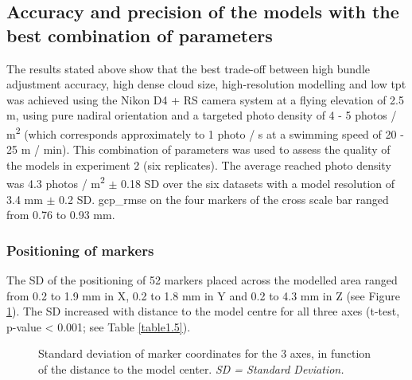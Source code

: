 \subsection{Accuracy and precision of the models with the best combination of parameters}\label{chapitre1_3.2}
The results stated above show that the best trade-off between high bundle adjustment accuracy, high dense cloud size, high-resolution modelling and low \acrshort{tpt} was achieved using the Nikon D4 + RS camera system at a flying elevation of 2.5 m, using pure nadiral orientation and a targeted photo density of 4 - 5 photos / m\textsuperscript{2} (which corresponds approximately to 1 photo / s at a swimming speed of 20 - 25 m / min). This combination of parameters was used to assess the quality of the models in experiment 2 (six replicates). The average reached photo density was 4.3 photos / m\textsuperscript{2} $\pm$ 0.18 SD over the six datasets with a model resolution of 3.4 mm $\pm$ 0.2 SD. \acrshort{gcp_rmse} on the four markers of the cross scale bar ranged from 0.76 to 0.93 mm.

\subsubsection{Positioning of markers}\label{chapitre1_3.2.1}
The SD of the positioning of 52 markers placed across the modelled area ranged from 0.2 to 1.9 mm in X, 0.2 to 1.8 mm in Y and 0.2 to 4.3 mm in Z (see Figure \ref{figure1.5}). The SD increased with distance to the model centre for all three axes (t-test, p-value < 0.001; see Table \ref{table1.5}).

\begin{figure}[htbp]
	\caption[Standard deviation of marker coordinates for the 3 axes]{Standard deviation of marker coordinates for the 3 axes, in function of the distance to the model center. \textit{SD = Standard Deviation.}}
	\label{figure1.5}
\end{figure}



